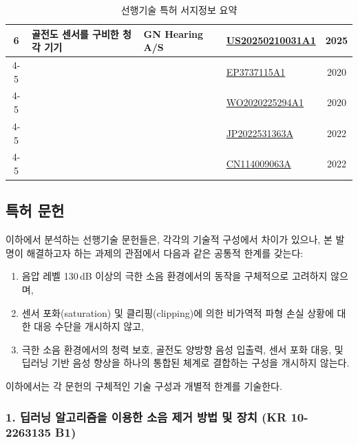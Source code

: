 \documentclass{article}
\begin{document}
\begin{table}[!h]
\begin{tabular}{|c|p{6.5cm}|p{3.5cm}|p{3cm}|c|}
    \multirow{5}{*}{6} 
    & \multirow{5}{=}{골전도 센서를 구비한 청각 기기} 
    & \multirow{5}{=}{GN Hearing A/S} 
    & \href{https://patents.google.com/patent/US20250210031A1/en?oq=EP3737115A1}{US20250210031A1} & 2025 \\ \cline{4-5}
    &  &  & \href{https://patents.google.com/patent/EP3967060A1/en?oq=EP3737115A1}{EP3737115A1} & 2020 \\ \cline{4-5}
    &  &  & \href{https://patents.google.com/patent/WO2020225294A1/en?oq=EP3737115A1}{WO2020225294A1} & 2020 \\ \cline{4-5}
    &  &  & \href{https://patents.google.com/patent/JP2022531363A/en?oq=EP3737115A1}{JP2022531363A} & 2022 \\ \cline{4-5}
    &  &  & \href{https://patents.google.com/patent/CN114009063A/en?oq=EP3737115A1}{CN114009063A} & 2022 \\
    \hline
    
    \end{tabular}
\caption{선행기술 특허 서지정보 요약}
\end{table}



\subsection{특허 문헌}

이하에서 분석하는 선행기술 문헌들은, 각각의 기술적 구성에서 차이가 있으나, 
본 발명이 해결하고자 하는 과제의 관점에서 다음과 같은 공통적 한계를 갖는다:
\begin{enumerate}[label = (\alph*)]
    \item 음압 레벨 130\,dB 이상의 극한 소음 환경에서의 동작을 구체적으로 고려하지 않으며,
    \item 센서 포화(saturation) 및 클리핑(clipping)에 의한 비가역적 파형 손실 상황에 대한 대응 수단을 개시하지 않고,
    
    \item 극한 소음 환경에서의 청력 보호, 골전도 양방향 음성 입출력, 센서 포화 대응, 및 딥러닝 기반 음성 향상을 하나의 통합된 체계로 결합하는 구성을 개시하지 않는다.
\end{enumerate}
이하에서는 각 문헌의 구체적인 기술 구성과 개별적 한계를 기술한다.

\subsubsection*{1. 딥러닝 알고리즘을 이용한 소음 제거 방법 및 장치 (KR 10-2263135 B1)}
\end{document}
